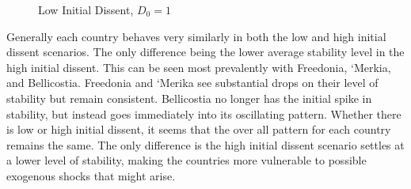 \documentclass[12pt]{article}
\begin{document}
\begin{spacing}{1.5}
\begin{figure}[htb]
\centering 
{} 
\caption{Low Initial Dissent, $D_0=1$}
\end{figure}

Generally each country behaves very similarly in both the low and high initial dissent scenarios. The only difference being the lower average stability level in the high initial dissent. This can be seen most prevalently with Freedonia, `Merkia, and Bellicostia. Freedonia and `Merika see substantial drops on their level of stability but remain consistent. Bellicostia no longer has the initial spike in stability, but instead goes immediately into its oscillating pattern. Whether there is low or high initial dissent, it seems that the over all pattern for each country remains the same. The only difference is the high initial dissent scenario settles at a lower level of stability, making the countries more vulnerable to possible exogenous shocks that might arise.    


\end{spacing}
\end{document}
